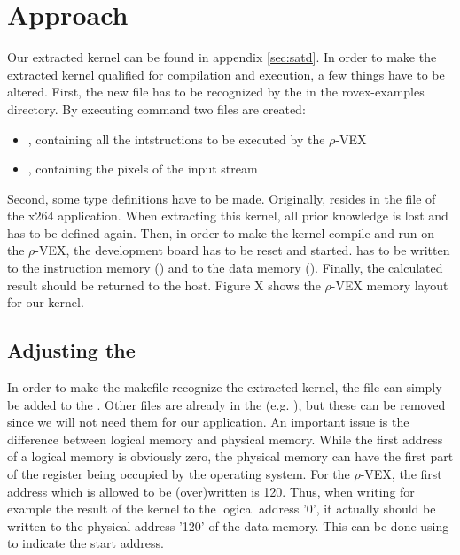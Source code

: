 
\section{Approach}

Our extracted kernel can be found in appendix \ref{sec:satd}. In order to make the extracted kernel qualified for compilation and execution, a few things have to be altered. First, the new file has to be recognized by the  in the rovex-examples directory. By executing  command two files are created:
\begin{itemize}
	\item {}, containing all the intstructions to be executed by the $\rho$-VEX
	\item {}, containing the pixels of the input stream
\end{itemize}

Second, some type definitions have to be made. Originally,  resides in the  file of the x264 application. When extracting this kernel, all prior knowledge is lost and has to be defined again. Then, in order to make the kernel compile and run on the $\rho$-VEX, the development board has to be reset and started.  has to be written to the instruction memory () and  to the data memory (). Finally, the calculated result should be returned to the host. Figure X shows the $\rho$-VEX memory layout for our kernel.

\subsection{Adjusting the }

In order to make the makefile recognize the extracted kernel, the file can simply be added to the . Other files are already in the  (e.g. ), but these can be removed since we will not need them for our application. An important issue is the difference between logical memory and physical memory. While the first address of a logical memory is obviously zero, the physical memory can have the first part of the register being occupied by the operating system. For the $\rho$-VEX, the first address which is allowed to be (over)written is 120. Thus, when writing for example the result of the kernel to the logical address '0', it actually should be written to the physical address '120' of the data memory. This can be done using  to indicate the start address.

